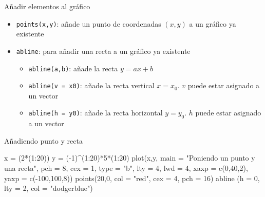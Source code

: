 \documentclass[
  ignorenonframetext,
  aspectratio=169]{beamer}
\newenvironment{Shaded}{\begin{snugshade}}{\end{snugshade}}
\newcommand{\AttributeTok}[1]{\textcolor[rgb]{0.77,0.63,0.00}{#1}}
\newcommand{\DecValTok}[1]{\textcolor[rgb]{0.00,0.00,0.81}{#1}}
\newcommand{\FunctionTok}[1]{\textcolor[rgb]{0.00,0.00,0.00}{#1}}
\newcommand{\NormalTok}[1]{#1}
\newcommand{\OtherTok}[1]{\textcolor[rgb]{0.56,0.35,0.01}{#1}}
\newcommand{\SpecialCharTok}[1]{\textcolor[rgb]{0.00,0.00,0.00}{#1}}
\newcommand{\StringTok}[1]{\textcolor[rgb]{0.31,0.60,0.02}{#1}}
\providecommand{\tightlist}{%
  \setlength{\itemsep}{0pt}\setlength{\parskip}{0pt}}
\begin{document}
\begin{frame}[fragile]{Añadir elementos al gráfico}
\protect\hypertarget{auxf1adir-elementos-al-gruxe1fico}{}
\begin{itemize}
\tightlist
\item
  \texttt{points(x,y)}: añade un punto de coordenadas \((x, y)\) a un
  gráfico ya existente
\item
  \texttt{abline}: para añadir una recta a un gráfico ya existente

  \begin{itemize}
  \tightlist
  \item
    \texttt{abline(a,b)}: añade la recta \(y=ax+b\)
  \item
    \texttt{abline(v\ =\ x0)}: añade la recta vertical \(x=x_0\). \(v\)
    puede estar asignado a un vector
  \item
    \texttt{abline(h\ =\ y0)}: añade la recta horizontal \(y=y_0\).
    \(h\) puede estar asignado a un vector
  \end{itemize}
\end{itemize}
\end{frame}

\begin{frame}[fragile]{Añadiendo punto y recta}
\protect\hypertarget{auxf1adiendo-punto-y-recta}{}
\begin{Shaded}
\begin{Highlighting}[]
\NormalTok{x }\OtherTok{=}\NormalTok{ (}\DecValTok{2}\SpecialCharTok{*}\NormalTok{(}\DecValTok{1}\SpecialCharTok{:}\DecValTok{20}\NormalTok{))}
\NormalTok{y }\OtherTok{=}\NormalTok{ (}\SpecialCharTok{{-}}\DecValTok{1}\NormalTok{)}\SpecialCharTok{\^{}}\NormalTok{(}\DecValTok{1}\SpecialCharTok{:}\DecValTok{20}\NormalTok{)}\SpecialCharTok{*}\DecValTok{5}\SpecialCharTok{*}\NormalTok{(}\DecValTok{1}\SpecialCharTok{:}\DecValTok{20}\NormalTok{)}
\FunctionTok{plot}\NormalTok{(x,y, }\AttributeTok{main =} \StringTok{"Poniendo un punto y una recta"}\NormalTok{, }\AttributeTok{pch =} \DecValTok{8}\NormalTok{,}
     \AttributeTok{cex =} \DecValTok{1}\NormalTok{, }\AttributeTok{type =} \StringTok{"b"}\NormalTok{, }\AttributeTok{lty =} \DecValTok{4}\NormalTok{, }
     \AttributeTok{lwd =} \DecValTok{4}\NormalTok{, }\AttributeTok{xaxp =} \FunctionTok{c}\NormalTok{(}\DecValTok{0}\NormalTok{,}\DecValTok{40}\NormalTok{,}\DecValTok{2}\NormalTok{), }\AttributeTok{yaxp =} \FunctionTok{c}\NormalTok{(}\SpecialCharTok{{-}}\DecValTok{100}\NormalTok{,}\DecValTok{100}\NormalTok{,}\DecValTok{8}\NormalTok{))}
\FunctionTok{points}\NormalTok{(}\DecValTok{20}\NormalTok{,}\DecValTok{0}\NormalTok{, }\AttributeTok{col =} \StringTok{"red"}\NormalTok{, }\AttributeTok{cex =} \DecValTok{4}\NormalTok{, }\AttributeTok{pch =} \DecValTok{16}\NormalTok{)}
\FunctionTok{abline}\NormalTok{ (}\AttributeTok{h =} \DecValTok{0}\NormalTok{, }\AttributeTok{lty =} \DecValTok{2}\NormalTok{, }\AttributeTok{col =} \StringTok{"dodgerblue"}\NormalTok{)}
\end{Highlighting}
\end{Shaded}
\end{frame}
\end{document}
